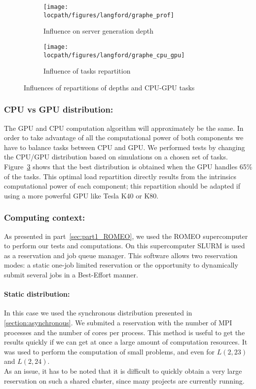 \begin{figure}[t!]
\begin{subfigure}[b]{0.5\linewidth}
\centering 
\texttt{[image: \\locpath/figures/langford/graphe\_prof]}
\caption{Influence on server generation depth}
\label{fig:graphe_prof}
\end{subfigure}
\begin{subfigure}[b]{0.5\linewidth}
\centering
\texttt{[image: \\locpath/figures/langford/graphe\_cpu\_gpu]}
\caption{Influence of tasks repartition}
\label{fig:graphe_rep}
\end{subfigure}
\caption{Influences of repartitions of depths and CPU-GPU tasks}
\end{figure}

\subsubsection{CPU vs GPU distribution: }
The GPU and CPU computation algorithm will approximately be the same. 
In order to take advantage of all the computational power of both components we have to balance tasks between CPU and GPU. 
We performed tests by changing the CPU/GPU distribution based on simulations on a chosen set of tasks.  
Figure~\ref{fig:graphe_rep} shows that the best distribution is obtained when the GPU handles 65\% of the tasks. 
This optimal load repartition directly results from the intrinsics computational power of each component; this repartition should be adapted if using a more powerful GPU like Tesla K40 or K80.

\subsubsection{Computing context: }

As presented in part~\ref{sec:part1_ROMEO}, we used the ROMEO supercomputer to perform our tests and computations.
On this supercomputer SLURM\cite{slurm} is used as a reservation and job queue manager.
This software allows two reservation modes: a static one-job limited reservation or the opportunity to dynamically submit several jobs in a Best-Effort manner.

\paragraph{Static distribution: }
In this case we used the synchronous distribution presented in \ref{section:asynchronous}. 
We submited a reservation with the number of MPI processes and the number of cores per process.
This method is useful to get the results quickly if we can get at once a large amount of computation resources. It was used to perform the computation of small problems, and even for $L(2,23)$ and $L(2,24)$.\\
As an issue, it has to be noted that it is difficult to quickly obtain a very large reservation on such a shared cluster, since many projects are currently running. 

